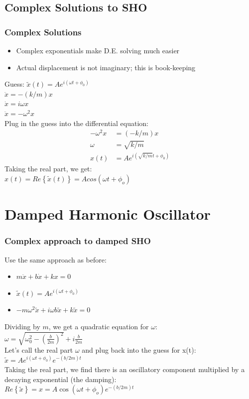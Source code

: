 \documentclass[pdf,hideothersubsections]{beamer}
\begin{document}
\subsection{Complex Solutions to SHO}
\begin{frame}
\frametitle{Complex Solutions}
\begin{itemize}
\item Complex exponentials make D.E. solving much easier
\pause
\item Actual displacement is not imaginary; this is book-keeping
\pause
\end{itemize}
Guess: $\tilde{x}(t) = A e^{i (\omega t + \phi_0)}$ \\
\pause
$\ddot{x} = -(k/m) x$ \\
\pause
$\dot{x} = i \omega x$ \\
\pause
$\ddot{x} = -\omega^2 x$ \\
Plug in the guess into the differential equation:
\begin{align*}
-\omega^2 x &= (-k/m) x \\
\omega &= \sqrt{k/m} \\
x(t) &= A e^{i (\sqrt{k/m} t + \phi_0)}
\end{align*}
\pause
Taking the real part, we get: \\
\pause
$x(t) = Re\left\{\tilde{x}(t)\right\} = A cos(\omega t + \phi_o)$

\end{frame}

\section{Damped Harmonic Oscillator}
\begin{frame}
\frametitle{Complex approach to damped SHO}
Use the same approach as before:
\begin{itemize}
\item $m \ddot{x} + b \dot{x} + k x = 0$
\pause
\item $\tilde{x}(t) = A e^{i (\omega t + \phi_0)}$
\pause
\item $-m \omega^2 \tilde{x} + i \omega b \tilde{x} + k \tilde{x} = 0$
\end{itemize}
\pause
Dividing by $m$, we get a quadratic equation for $\omega$: \\
\pause
$\omega = \sqrt{\omega_0^2 - (\frac{b}{2 m})^2} + i \frac{b}{2 m}$ \\
\pause
Let's call the real part $\omega$ and plug back into the guess for x(t):
\pause
$\tilde{x} = A e^{i (\omega t + \phi_0)} e^{-(b/2 m) t}$\\
\pause
Taking the real part, we find there is an oscillatory component multiplied by a decaying exponential (the damping): \\
\pause
$Re\left\{\tilde{x}\right\} = x = A \cos(\omega t + \phi_o) e^{-(b/2 m) t}$

\end{frame}
\end{document}
